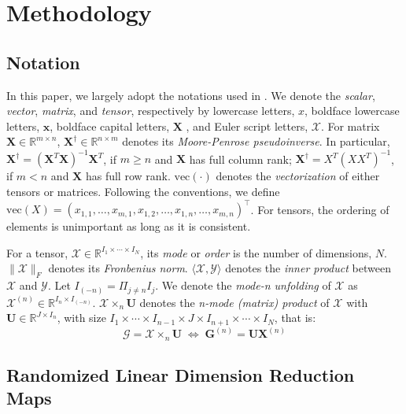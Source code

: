 \section{Methodology} 
\subsection{Notation}

In this paper, we largely adopt the notations used in \cite{kolda2009tensor}. We denote the \textit{scalar}, \textit{vector}, \textit{matrix}, and \textit{tensor}, respectively by lowercase letters, $x$, boldface lowercase letters, $\mathbf{x}$, boldface capital letters, $\mathbf{X}$ , and Euler script letters, $\mathscr{X}$. For matrix $\mathbf{X} \in \mathbb{R}^{m \times n}$, $\mathbf{X}^\dag \in \mathbb{R}^{n \times m}$ denotes its \textit{Moore-Penrose pseudoinverse}. In particular, $\mathbf{X}^\dag = (\mathbf{X}^T \mathbf{X})^{-1}\mathbf{X}^T$, if $m \geq n$ and $\mathbf{X}$ has full column rank; $\mathbf{X}^\dag = X^T(XX^T)^{-1}$, if $m < n$ and $\mathbf{X}$ has full row rank. $\mbox{vec}(\cdot)$ denotes the \textit{vectorization} of either tensors or matrices. Following the conventions, we define $\mbox{vec}(X) = (x_{1,1},\dots,x_{m,1},x_{1,2},\dots,x_{1,n},\dots,x_{m,n})^\top$. For tensors, the ordering of elements is unimportant as long as it is consistent. 

For a tensor, $\mathscr{X} \in \mathbb{R}^{I_1 \times \cdots \times I_N}$, its \textit{mode} or \textit{order} is the number of dimensions, $N$. $\|\mathscr{X}\|_F$ denotes its \textit{Fronbenius norm}. $\langle \mathscr{X}, \mathscr{Y} \rangle$ denotes the \textit{inner product} between $\mathscr{X}$ and $\mathscr{Y}$. Let $I_{(-n)} = \Pi_{j \neq n} I_j $. We denote the \textit{mode-n unfolding} of $\mathscr{X}$ as $\mathscr{X}^{(n)} \in \mathbb{R}^{I_n \times I_{(-n)}}$. $\mathscr{X} \times_n \mathbf{U}$ denotes the \textit{n-mode (matrix) product} of $\mathscr{X}$ with $\mathbf{U} \in \mathbb{R}^{J \times I_n}$, with size $I_1 \times \cdots \times I_{n-1} \times J \times I_{n+1} \times \cdots \times I_N$, that is: 
\begin{equation}
\mathscr{G} = \mathscr{X} \times_n \mathbf{U} \; \iff \; \mathbf{G}^{(n)} = \mathbf{U}\mathbf{X}^{(n)}
\end{equation}

\subsection{Randomized Linear Dimension Reduction Maps}

